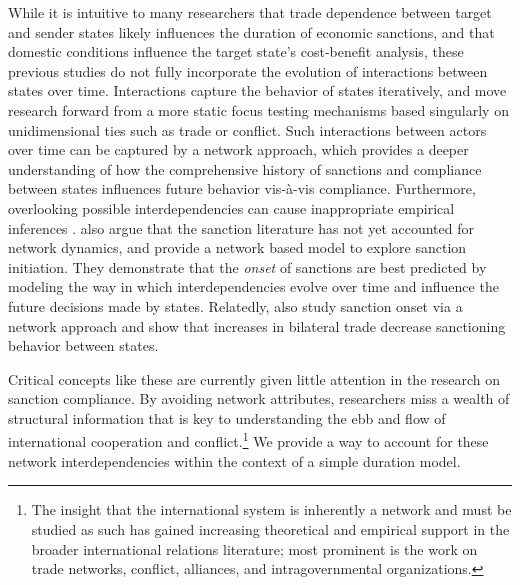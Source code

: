 While it is intuitive to many researchers that trade dependence between target and sender states likely influences the duration of economic sanctions, and that domestic conditions influence the target state's cost-benefit analysis, these previous studies do not fully incorporate the evolution of interactions between states over time. Interactions capture the  behavior of states iteratively, and move research forward from a more static focus testing mechanisms based singularly on unidimensional ties such as trade or conflict. Such interactions between actors over time can be captured by a network approach, which provides a deeper understanding of how the comprehensive history of sanctions and compliance between states influences future behavior vis-\`a-vis compliance. Furthermore, overlooking possible interdependencies can cause inappropriate empirical inferences \citep{erikson2014dyadic}. \citet{cranmer2014reciprocity} also argue that the sanction literature has not yet accounted for network dynamics, and provide a network based model to explore sanction initiation. They demonstrate that the \textit{onset} of sanctions are best predicted by modeling the way in which interdependencies evolve over time and influence the future decisions made by states. Relatedly, \citet{hafner2008} also study sanction onset via a network approach and show that increases in bilateral trade decrease sanctioning behavior between states.

Critical concepts like these are currently given little attention in the research on sanction compliance. By avoiding network attributes, researchers miss a wealth of structural information that is key to understanding the ebb and flow of international cooperation and conflict.\footnote{The insight that the international system is inherently a network and must be studied as such has gained increasing theoretical and empirical support in the broader international relations literature; most prominent is the work on trade networks,\cite{hoff2004modeling, ward:rainbow:2013} conflict,\cite{ward2007disputes} alliances,\cite{warren2010geometry} and intragovernmental organizations.\cite{cao2009networks,greenhill2010norm}} We provide a way to account for these network interdependencies within the context of a simple duration model.

